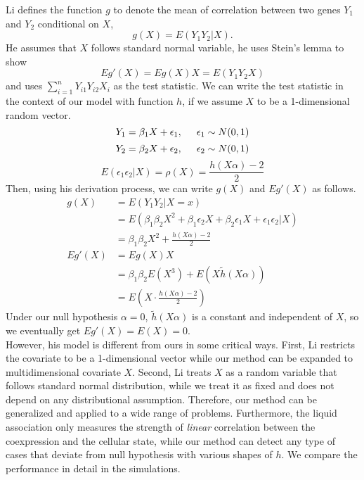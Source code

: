\documentclass[12pt]{extarticle}
\theoremstyle{theorem}
\begin{document}
\noindent Li defines the function $g$ to denote the mean of correlation between two genes $Y_1$ and $Y_2$ conditional on $X$,
$$g(X) = E(Y_1 Y_2 | X).$$
He assumes that $X$ follows standard normal variable, he uses Stein's lemma to show
$$Eg'(X) = Eg(X)X = E(Y_1Y_2X)$$
and uses $\sum_{i=1}^{n} Y_{i1}Y_{i2}X_i$ as the test statistic. We can write the test statistic in the context of our model with function $h$, if we assume $X$ to be a 1-dimensional random vector. 
$$Y_1 = \beta_1X + \epsilon_1, \hspace{5mm} \epsilon_1 \sim N(0,1)$$
$$Y_2 = \beta_2 X + \epsilon_2, \hspace{5mm} \epsilon_2 \sim N(0,1)$$
$$E(\epsilon_1 \epsilon_2 | X) = \rho(X) = \frac{h(X\alpha)-2}{2}$$
Then, using his derivation process, we can write $g(X)$ and $Eg'(X)$ as follows.
\begin{align*}
g(X) &= E(Y_1Y_2 | X = x)\\
&= E(\beta_1\beta_2 X^2 + \beta_1\epsilon_2X + \beta_2\epsilon_1X + \epsilon_1\epsilon_2 | X)\\
&= \beta_1 \beta_2 X^2  +\frac{h(X\alpha)-2}{2}\\
Eg'(X) &= Eg(X)X\\
&= \beta_1\beta_2E(X^3) + E\left( X\tilde{h}(X\alpha)\right)\\
&= E\left( X \cdot \frac{h(X\alpha)-2}{2}\right)
\end{align*}
Under our null hypothesis $\alpha = 0$, $\tilde{h}(X\alpha)$ is a constant and independent of $X$, so we eventually get $Eg'(X) = E(X) = 0$.\\


\noindent However, his model is different from ours in some critical ways. First, Li restricts the covariate to be a 1-dimensional vector while our method can be expanded to multidimensional covariate $X$. Second, Li treats $X$ as a random variable that follows standard normal distribution, while we treat it as fixed and does not depend on any distributional assumption. Therefore, our method can be generalized and applied to a wide range of problems. Furthermore, the liquid association only measures the strength of \textit{linear} correlation between the coexpression and the cellular state, while our method can detect any type of cases that deviate from null hypothesis with various shapes of $h$. We compare the performance in detail in the simulations. 
\end{document}
